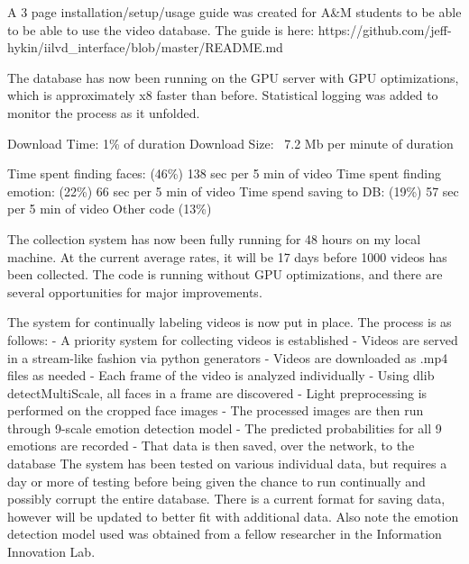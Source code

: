 \documentclass{article}
\newcommand{\br}{ \hfill \break}
\begin{document}
%
%
%
\date{June 16 2020} \br \begin{adjustwidth}{2.5em}{0pt}
A 3 page installation/setup/usage guide was created for A\&M students to be able to be able to use the video database. The guide is here: \br
https://github.com/jeff-hykin/iilvd\_interface/blob/master/README.md
\end{adjustwidth} \br

%
%
%
\date{June 15 2020} \br \begin{adjustwidth}{2.5em}{0pt}
The database has now been running on the GPU server with GPU optimizations, which is approximately x8 faster than before. Statistical logging was added to monitor the process as it unfolded.

Download Time: 1\% of duration
Download Size: ~7.2 Mb per minute of duration

Time spent finding faces:		(46\%) 138 sec per 5 min of video
Time spent finding emotion: 	(22\%) 66 sec per 5 min of video
Time spend saving to DB:		(19\%) 57 sec per 5 min of video
Other code (13\%)
\end{adjustwidth} \br




%
%
%
\date{June 13th 2020} \br \begin{adjustwidth}{2.5em}{0pt}
The collection system has now been fully running for 48 hours on my local machine. At the current average rates, it will be 17 days before 1000 videos has been collected. The code is running without GPU optimizations, and there are several opportunities for major improvements.
\end{adjustwidth} \br


%
%
%
\date{June 9 2020} \br \begin{adjustwidth}{2.5em}{0pt}
The system for continually labeling videos is now put in place. The process is as follows:\br 
- A priority system for collecting videos is established\br
- Videos are served in a stream-like fashion via python generators\br
- Videos are downloaded as .mp4 files as needed\br
- Each frame of the video is analyzed individually\br
- Using dlib detectMultiScale, all faces in a frame are discovered\br
- Light preprocessing is performed on the cropped face images\br
- The processed images are then run through 9-scale emotion detection model\br
- The predicted probabilities for all 9 emotions are recorded\br
- That data is then saved, over the network, to the database\br
\br
The system has been tested on various individual data, but requires a day or more of testing before being given the chance to run continually and possibly corrupt the entire database. There is a current format for saving data, however will be updated to better fit with additional data. Also note the emotion detection model used was obtained from a fellow researcher in the Information Innovation Lab.
\end{adjustwidth} \br
\end{document}
